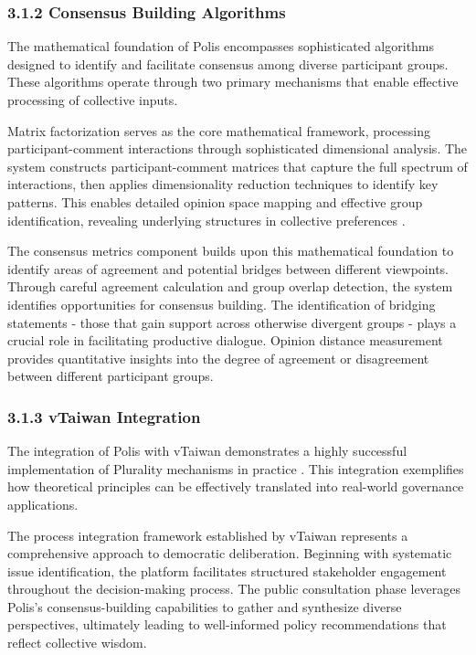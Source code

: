 \hypertarget{consensus-building-algorithms}{%
\subsubsection{3.1.2 Consensus Building Algorithms}\label{consensus-building-algorithms}}

The mathematical foundation of Polis encompasses sophisticated algorithms designed to identify and facilitate consensus among diverse participant groups. These algorithms operate through two primary mechanisms that enable effective processing of collective inputs.

Matrix factorization serves as the core mathematical framework, processing participant-comment interactions through sophisticated dimensional analysis. The system constructs participant-comment matrices that capture the full spectrum of interactions, then applies dimensionality reduction techniques to identify key patterns. This enables detailed opinion space mapping and effective group identification, revealing underlying structures in collective preferences \citep{polis2024}.

The consensus metrics component builds upon this mathematical foundation to identify areas of agreement and potential bridges between different viewpoints. Through careful agreement calculation and group overlap detection, the system identifies opportunities for consensus building. The identification of bridging statements - those that gain support across otherwise divergent groups - plays a crucial role in facilitating productive dialogue. Opinion distance measurement provides quantitative insights into the degree of agreement or disagreement between different participant groups.

\hypertarget{vtaiwan-integration}{%
\subsubsection{3.1.3 vTaiwan Integration}\label{vtaiwan-integration}}

The integration of Polis with vTaiwan demonstrates a highly successful implementation of Plurality mechanisms in practice \citep{vtaiwan2023}. This integration exemplifies how theoretical principles can be effectively translated into real-world governance applications.

The process integration framework established by vTaiwan represents a comprehensive approach to democratic deliberation. Beginning with systematic issue identification, the platform facilitates structured stakeholder engagement throughout the decision-making process. The public consultation phase leverages Polis's consensus-building capabilities to gather and synthesize diverse perspectives, ultimately leading to well-informed policy recommendations that reflect collective wisdom.

